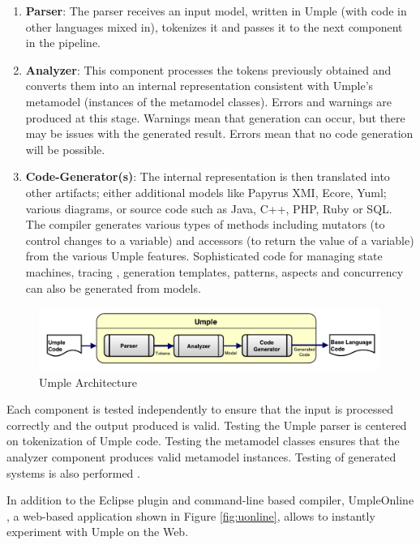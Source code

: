 \begin{enumerate}
\item \textbf{Parser}: The parser receives an input model, written in Umple (with code in other languages mixed in), tokenizes it and passes it to the next component in the pipeline.

\item \textbf{Analyzer}: This component processes the tokens previously obtained and converts them into an internal representation consistent with Umple's metamodel (instances of the metamodel classes). Errors and warnings are produced at this stage. Warnings mean that generation can occur, but there may be issues with the generated result. Errors mean that no code generation will be possible.

\item \textbf{Code-Generator(s)}: The internal representation is then translated into other artifacts; either additional models like Papyrus XMI, Ecore, Yuml; various diagrams, or source code such as Java, C++, PHP, Ruby or SQL. The compiler generates various types of methods including mutators (to control changes to a variable) and accessors (to return the value of a variable) from the various Umple features. Sophisticated code for managing state machines, tracing \cite{UmpleTracing}, generation templates, patterns, aspects and concurrency can also be generated from models.

\end{enumerate}
\begin{figure}[h]
\centering
\includegraphics[width=0.99\textwidth]{Figures/umpleArchitecture.pdf} 
\caption{Umple Architecture}
\label{fig:umpleArchitecture}
\end{figure}

Each component is tested independently to ensure that the input is processed correctly and the output produced is valid. Testing the Umple parser is centered on tokenization of Umple code. Testing the metamodel classes ensures that the analyzer component produces valid metamodel instances. Testing of generated systems is also performed \cite{umpleTesting2014}.


In addition to the Eclipse plugin and command-line based compiler, UmpleOnline \cite{UmpleOnline}, a web-based application shown in Figure \ref{fig:uonline}, allows to instantly experiment with Umple on the Web. 

